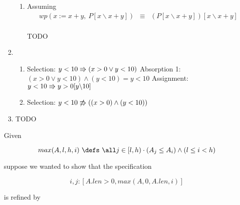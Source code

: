 \documentclass{article}
\begin{document}
\begin{enumerate}
\begin{enumerate}
            \item Assuming
                \begin{eqnarray*}
                    wp(x := x + y,\ P[x \backslash x + y]) & \equiv & (P[x \backslash x + y])[x \backslash x + y]\\
                \end{eqnarray*}

                TODO

        \end{enumerate}
    \item
        \begin{enumerate}
            \item 
                \DERIVE
                 {Selection: $y < 10 \Rrightarrow (x > 0 \lor y < 10)$}
                 {Absorption 1: $(x > 0 \lor y < 10) \land (y < 10) = y < 10$}
                 {Assignment: $y < 10 \Rrightarrow y > 0[y \backslash 10]$}
                \ENDDERIVE

            \item 
                \DERIVE
                \hint{\doesntrefsto} {Selection: $y < 10 \not\Rrightarrow ((x > 0) \land (y < 10))$}

                \ENDDERIVE
        \end{enumerate}
    \item TODO

\end{enumerate}

Given 

\[max(A,l,h,i) ~\defs~ \all j \in [l,h) \cdot (A_j \leq A_i) \land (l \leq i < h)\]   %

suppose we wanted to show that the specification

\[i,j:[A.len > 0, max(A,0,A.len,i)]\]

is refined by
\end{document}
